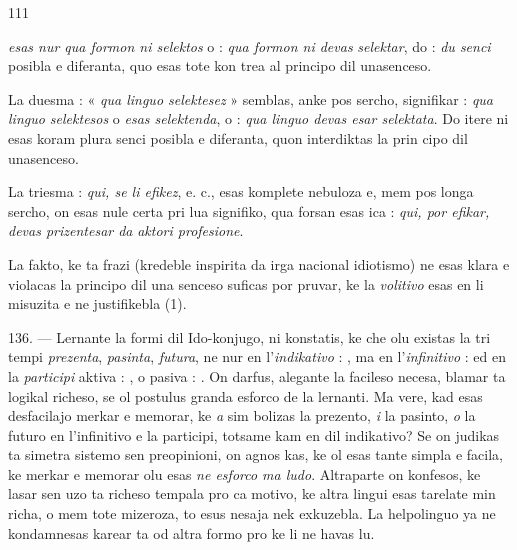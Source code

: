 \begin{VUpage}[115]{111}

\VUcontinue
\textit{esas nur qua formon ni selektos} o : \textit{qua formon ni devas}\nl
\textit{selektar}, do : \textit{du senci} posibla e diferanta, quo esas tote kon\cc
trea al principo dil unasenceso.

La duesma : « \textit{qua linguo selektesez} » semblas, anke pos\nl
sercho, signifikar : \textit{qua linguo selektesos} o \textit{esas selektenda},\nl
o : \textit{qua linguo devas esar selektata}. Do itere ni esas koram\nl
plura senci posibla e diferanta, quon interdiktas la prin\cc
cipo dil unasenceso.

La triesma : \textit{qui, se li efikez}, e. c., esas komplete nebuloza\nl
e, mem pos longa sercho, on esas nule certa pri lua signifiko,\nl
qua forsan esas ica : \textit{qui, por efikar, devas prizentesar da}\nl
\textit{aktori profesione}.

La fakto, ke ta frazi (kredeble inspirita da irga nacional\nl
idiotismo) ne esas klara e violacas la principo dil una\cc
senceso suficas por pruvar, ke la \textit{volitivo} esas en li misuzita\nl
e ne justifikebla (1).

\VUblanc{5.71pt}%
136. --- Lernante la formi dil Ido-konjugo, ni konstatis,\nl
ke che olu existas la tri tempi \textit{prezenta}, \textit{pasinta}, \textit{futura}, ne\nl
nur en l'\textit{indikativo} : , ma en l'\textit{infinitivo} : \nl
{} ed en la \textit{participi} aktiva : , o pasiva : \nl
{}. On darfus, alegante la facileso necesa, blamar ta\nl
logikal richeso, se ol postulus granda esforco de la lernanti.\nl
Ma vere, kad esas desfacilajo merkar e memorar, ke \textit{a} sim\cc
bolizas la prezento, \textit{i} la pasinto, \textit{o} la futuro en l'infinitivo\nl
e la participi, totsame kam en  dil indikativo?\nl
Se on judikas ta simetra sistemo sen preopinioni, on agnos\cc
kas, ke ol esas tante simpla e facila, ke merkar e memorar\nl
olu esas \textit{ne esforco ma ludo}. Altraparte on konfesos, ke lasar\nl
sen uzo ta richeso tempala pro ca motivo, ke altra lingui\nl
esas tarelate min richa, o mem tote mizeroza, to esus nesaja\nl
nek exkuzebla. La helpolinguo ya ne kondamnesas karear\nl
ta od altra formo pro ke li ne havas lu.
\end{VUpage}

